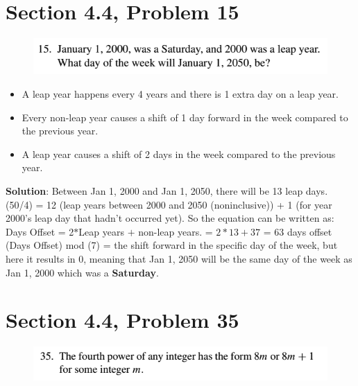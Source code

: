 \documentclass{article}
\begin{document}
\begin{large}
\clearpage
\header

\section*{Section 4.4, Problem 15}

\begin{figure}[h]
\includegraphics{HW2Prob2}
\centering
\end{figure}

\begin{itemize}
 \item A leap year happens every 4 years and there is 1 extra day on a leap year.
 \item Every non-leap year causes a shift of 1 day forward in the week compared to the previous year. 
\item A leap year causes a shift of 2 days in the week compared to the previous year.
\end{itemize}
\textbf{Solution}: Between Jan 1, 2000 and Jan 1, 2050, there will be 13 leap days. (50/4) = 12 (leap years between 2000 and 2050 (noninclusive)) + 1 (for year 2000's leap day that hadn't occurred yet). \newline \newline
So the equation can be written as: Days Offset = 2$*$Leap years $+$ non-leap years. 
\newline = $2*13 + 37$ 
\newline = 63 days offset
\newline (Days Offset) mod (7) = the shift forward in the specific day of the week, but here it results in 0, meaning that Jan 1, 2050 will be the same day of the week as Jan 1, 2000 which was a \textbf{Saturday}.

\clearpage
\header

\section*{Section 4.4, Problem 35}

\begin{figure}[h]
\includegraphics{HW2Prob3}
\centering
\end{figure}




\end{large}
\end{document}
